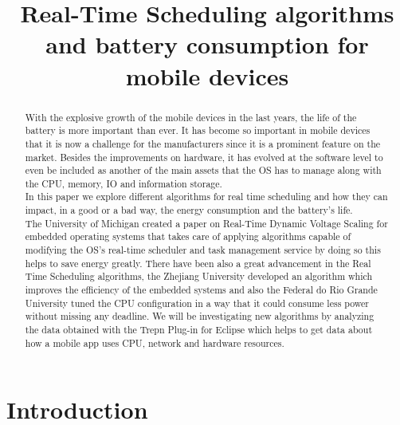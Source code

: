 \documentclass[conference]{IEEEtran}
\title{Real-Time Scheduling algorithms and battery consumption for mobile devices}
\author{\IEEEauthorblockN{David S\'anchez Alb\'an,   Natalia Mar\'in P\'erez,   Luis Diego Chavarr\'ia Ledezma,   Bryant \'Alvarez Canales}
\IEEEauthorblockA{Ingenier\'ia en Computaci\'on\\
Instituto Tecnol\'ogico de Costa Rica\\
San Jos\'e, Costa Rica}
}
\begin{document}
 
\maketitle


\begin{abstract}
With the explosive growth of the mobile devices in the last years, the life of the battery is more important than ever. It has become so important in mobile devices that it is now a challenge for the manufacturers since it is a prominent feature on the market. Besides the improvements on hardware, it has evolved at the software level to even be included as another of the main assets that the OS has to manage along with the CPU, memory, IO and information storage.\\
In this paper we explore different algorithms for real time scheduling and how they can impact, in a good or a bad way, the energy consumption and the battery’s life.\\
The University of Michigan created a paper on Real-Time Dynamic Voltage Scaling for embedded operating systems that takes care of applying algorithms capable of modifying the OS's real-time scheduler and task management service by doing so this helps to save energy greatly. There have been also a great advancement in the Real Time Scheduling algorithms, the Zhejiang University developed an algorithm which improves the efficiency of the embedded systems and also the Federal do Rio Grande University tuned the CPU configuration in a way that it could consume less power without missing any deadline. We will be investigating new algorithms by analyzing the data obtained with the Trepn Plug-in for Eclipse which helps to get data about how a mobile app uses CPU, network and hardware resources.
\end{abstract}

\section{Introduction}
\end{document}
